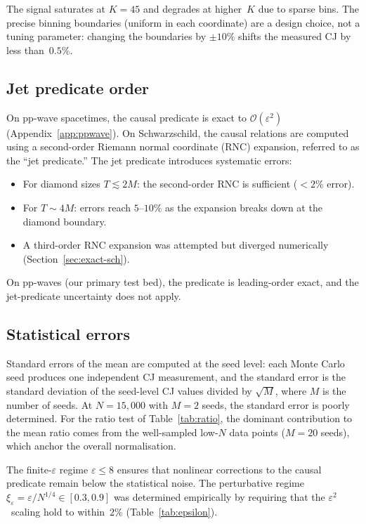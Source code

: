 \documentclass[12pt,a4paper]{article}
\theoremstyle{plain}
\theoremstyle{definition}
\theoremstyle{remark}
\newcommand{\order}{\mathcal{O}}
\begin{document}
The signal saturates at $K = 45$ and degrades at higher~$K$ due to
sparse bins.  The precise binning boundaries (uniform in each
coordinate) are a design choice, not a tuning parameter: changing
the boundaries by $\pm 10\%$ shifts the measured CJ by less
than~$0.5\%$.

\subsection{Jet predicate order}
\label{sec:jet-order}

On pp-wave spacetimes, the causal predicate is exact to
$\order(\varepsilon^2)$ (Appendix~\ref{app:ppwave}).  On
Schwarzschild, the causal relations are computed using a
second-order Riemann normal coordinate (RNC) expansion, referred
to as the ``jet predicate.''  The jet predicate introduces
systematic errors:
\begin{itemize}
\item For diamond sizes $T \lesssim 2M$: the second-order RNC is
  sufficient ($< 2\%$ error).
\item For $T \sim 4M$: errors reach $5$--$10\%$ as the expansion
  breaks down at the diamond boundary.
\item A third-order RNC expansion was attempted but diverged
  numerically (Section~\ref{sec:exact-sch}).
\end{itemize}
On pp-waves (our primary test bed), the predicate is leading-order
exact, and the jet-predicate uncertainty does not apply.

\subsection{Statistical errors}
\label{sec:stat-errors}

Standard errors of the mean are computed at the seed level: each
Monte Carlo seed produces one independent CJ measurement, and the
standard error is the standard deviation of the seed-level CJ values
divided by $\sqrt{M}$, where $M$ is the number of seeds.  At
$N = 15{,}000$ with $M = 2$ seeds, the standard error is
poorly determined.  For the ratio test of Table~\ref{tab:ratio},
the dominant contribution to the mean ratio comes from the
well-sampled low-$N$ data points ($M = 20$ seeds), which anchor the
overall normalisation.

The finite-$\varepsilon$ regime $\varepsilon \leq 8$ ensures that
nonlinear corrections to the causal predicate remain below the
statistical noise.  The perturbative regime
$\xi_\varepsilon = \varepsilon / N^{1/4} \in [0.3, 0.9]$ was
determined empirically by requiring that the $\varepsilon^2$~scaling
hold to within~$2\%$ (Table~\ref{tab:epsilon}).
\end{document}
